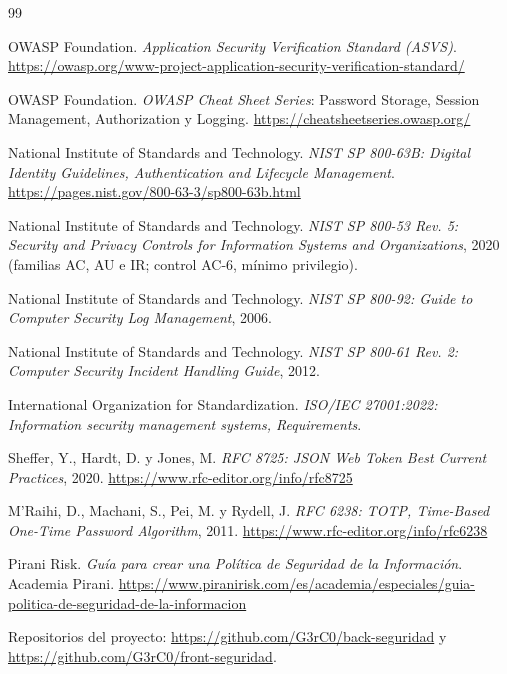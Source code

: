 \documentclass[12pt,letterpaper]{article}
\begin{document}
\begin{thebibliography}{99}
\renewcommand{\refname}{BIBLIOGRAFÍA}

 OWASP Foundation. \textit{Application Security Verification Standard (ASVS)}. \url{https://owasp.org/www-project-application-security-verification-standard/}

 OWASP Foundation. \textit{OWASP Cheat Sheet Series}: Password Storage, Session Management, Authorization y Logging. \url{https://cheatsheetseries.owasp.org/}

 National Institute of Standards and Technology. \textit{NIST SP 800-63B: Digital Identity Guidelines, Authentication and Lifecycle Management}. \url{https://pages.nist.gov/800-63-3/sp800-63b.html}

 National Institute of Standards and Technology. \textit{NIST SP 800-53 Rev. 5: Security and Privacy Controls for Information Systems and Organizations}, 2020 (familias AC, AU e IR; control AC-6, mínimo privilegio).

 National Institute of Standards and Technology. \textit{NIST SP 800-92: Guide to Computer Security Log Management}, 2006.

 National Institute of Standards and Technology. \textit{NIST SP 800-61 Rev. 2: Computer Security Incident Handling Guide}, 2012.

 International Organization for Standardization. \textit{ISO/IEC 27001:2022: Information security management systems, Requirements}.

 Sheffer, Y., Hardt, D. y Jones, M. \textit{RFC 8725: JSON Web Token Best Current Practices}, 2020. \url{https://www.rfc-editor.org/info/rfc8725}

 M'Raihi, D., Machani, S., Pei, M. y Rydell, J. \textit{RFC 6238: TOTP, Time-Based One-Time Password Algorithm}, 2011. \url{https://www.rfc-editor.org/info/rfc6238}

 Pirani Risk. \textit{Guía para crear una Política de Seguridad de la Información}. Academia Pirani. \url{https://www.piranirisk.com/es/academia/especiales/guia-politica-de-seguridad-de-la-informacion}

 Repositorios del proyecto: \url{https://github.com/G3rC0/back-seguridad} y \url{https://github.com/G3rC0/front-seguridad}.
\end{thebibliography}
\end{document}
